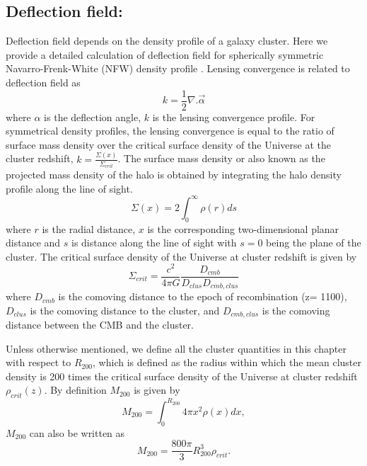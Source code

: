\subsection*{Deflection field:}
\label{def_field}
Deflection field depends on the density profile of a galaxy cluster. Here we provide a detailed calculation of deflection field for spherically symmetric Navarro-Frenk-White (NFW) density profile \cite{navarro96}.  Lensing convergence is related to deflection field as %
\begin{equation}
 k = \frac{1}{2}\nabla. \vec{\alpha} %
\label{eq_kappa}
 \end{equation}
 where $\alpha$ is the deflection angle, $k$ is the lensing convergence profile. %
 For symmetrical density profiles, the lensing convergence is equal to the ratio of surface mass density over the critical surface density of the Universe at the cluster redshift, $k = \frac{\Sigma(x)}{\Sigma_{crit}}$.
The surface mass density or also known as the projected mass density of the halo is obtained by integrating the halo density profile along the line of sight. 
 \begin{equation}
 \Sigma(x) = 2 \int^{\infty}_{0} \rho(r) ds
 \label{eq:surface_density}
 \end{equation}
 where $r$ is the radial distance, $x$ is the corresponding two-dimensional planar distance and $s$ is distance along the line of sight with $s = 0$ being the plane of the cluster.
 The critical surface density of the Universe at cluster redshift is given by
 \begin{equation}
 \Sigma_{crit} = \frac{c^{2}}{4\pi G} \frac{D_{cmb}}{D_{clus}D_{cmb,clus}}
 \end{equation}
 where $D_{cmb}$ is the comoving distance to the epoch of recombination (z= 1100), $D_{clus}$ is the comoving distance to the cluster, and $D_{cmb,clus}$ is the comoving distance between the CMB and the cluster.
 
 Unless otherwise mentioned, we define all the cluster quantities in this chapter with respect to $R_{200}$, which is defined as the radius within which the mean cluster density is 200 times the critical surface density of the Universe at cluster redshift $\rho_{crit}(z)$. By definition $M_{200}$ is given by 
 \begin{equation}
 M_{200} = \int^{R_{200}}_{0}  4\pi x^{2} \rho(x) dx,
 \end{equation}
 $M_{200}$ can also be written as
 \begin{equation}
 M_{200} = \frac{800\pi}{3} R^{3}_{200} \rho_{crit}.
 \end{equation}
 
